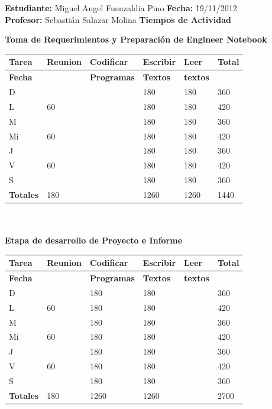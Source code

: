 \documentclass[a4paper,12pt,openany,oneside]{book}
\begin{document}
\begin{tabbing}
\textbf{Estudiante:} \= Miguel Angel Fuenzaldia Pino \= \textbf{Fecha:} \= 19/11/2012\\
\textbf{Profesor:} \> Sebastián Salazar Molina \> \textbf{Tiempos de Actividad} \>  \\
\end{tabbing}
\textbf{Toma de Requerimientos y Preparación de Engineer Notebook}\\
\begin{tabular}{| l | l | l | l | l | l |}
\hline
\textbf{Tarea} & \textbf{Reunion} & \textbf{Codificar} & \textbf{Escribir} & \textbf{Leer} & \textbf{Total} \\
\hline
\textbf{Fecha} &                  & \textbf{Programas} & \textbf{Textos} & \textbf{textos} & \\
\hline
D  &    & & 180 & 180 & 360 \\
\hline
L  & 60 & & 180 & 180 & 420 \\
\hline
M  &    & & 180 & 180 & 360 \\
\hline
Mi & 60 & & 180 & 180 & 420 \\
\hline
J  &    & & 180 & 180 & 360 \\
\hline
V  & 60 & & 180 & 180 & 420 \\
\hline
S  &    & & 180 & 180 & 360 \\
\hline
\textbf{Totales} & 180 & & 1260 & 1260 & 1440 \\
\hline
\end{tabular}
\\\\
\textbf{Etapa de desarrollo de Proyecto e Informe}\\
\begin{tabular}{| l | l | l | l | l | l |}
\hline
\textbf{Tarea} & \textbf{Reunion} & \textbf{Codificar} & \textbf{Escribir} & \textbf{Leer} & \textbf{Total} \\
\hline
\textbf{Fecha} &                  & \textbf{Programas} & \textbf{Textos} & \textbf{textos} & \\
\hline
D  &    & 180 & 180 &  & 360 \\
\hline
L  & 60 & 180 & 180 &  & 420 \\
\hline
M  &    & 180 & 180 &  & 360 \\
\hline
Mi & 60 & 180 & 180 &  & 420 \\
\hline
J  &    & 180 & 180 &  & 360 \\
\hline
V  & 60 & 180 & 180 &  & 420 \\
\hline
S  &    & 180 & 180 &  & 360 \\
\hline
\textbf{Totales} & 180 & 1260 & 1260 &  & 2700 \\
\hline
\end{tabular}
\end{document}
